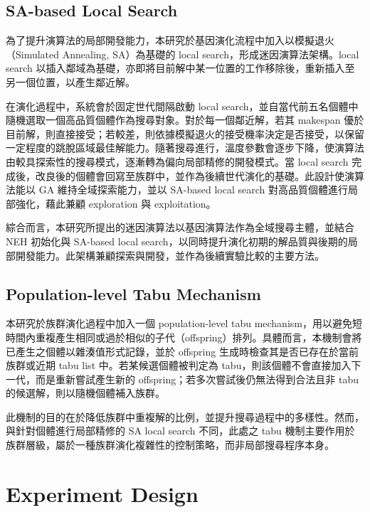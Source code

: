 \documentclass[conference]{IEEEtran}
\begin{document}
\subsection{SA-based Local Search}

為了提升演算法的局部開發能力，本研究於基因演化流程中加入以模擬退火（Simulated Annealing, SA）為基礎的 local search，形成迷因演算法架構。local search 以插入鄰域為基礎，亦即將目前解中某一位置的工作移除後，重新插入至另一個位置，以產生鄰近解。

在演化過程中，系統會於固定世代間隔啟動 local search，並自當代前五名個體中隨機選取一個高品質個體作為搜尋對象。對於每一個鄰近解，若其 makespan 優於目前解，則直接接受；若較差，則依據模擬退火的接受機率決定是否接受，以保留一定程度的跳脫區域最佳解能力。隨著搜尋進行，溫度參數會逐步下降，使演算法由較具探索性的搜尋模式，逐漸轉為偏向局部精修的開發模式。當 local search 完成後，改良後的個體會回寫至族群中，並作為後續世代演化的基礎。此設計使演算法能以 GA 維持全域探索能力，並以 SA-based local search 對高品質個體進行局部強化，藉此兼顧 exploration 與 exploitation。

綜合而言，本研究所提出的迷因演算法以基因演算法作為全域搜尋主體，並結合 NEH 初始化與 SA-based local search，以同時提升演化初期的解品質與後期的局部開發能力。此架構兼顧探索與開發，並作為後續實驗比較的主要方法。

\subsection{Population-level Tabu Mechanism}
本研究於族群演化過程中加入一個 population-level tabu mechanism，用以避免短時間內重複產生相同或過於相似的子代（offspring）排列。具體而言，本機制會將已產生之個體以雜湊值形式記錄，並於 offspring 生成時檢查其是否已存在於當前族群或近期 tabu list 中。若某候選個體被判定為 tabu，則該個體不會直接加入下一代，而是重新嘗試產生新的 offspring；若多次嘗試後仍無法得到合法且非 tabu 的候選解，則以隨機個體補入族群。

此機制的目的在於降低族群中重複解的比例，並提升搜尋過程中的多樣性。然而，與針對個體進行局部精修的 SA local search 不同，此處之 tabu 機制主要作用於族群層級，屬於一種族群演化複雜性的控制策略，而非局部搜尋程序本身。





\section{Experiment Design}
\fontsize{10pt}{12pt}\selectfont
\end{document}
